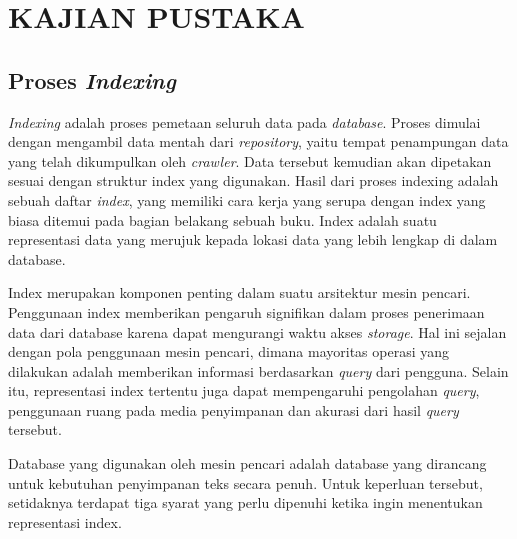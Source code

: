 
\chapter{KAJIAN PUSTAKA} 


\section{Proses \emph{Indexing}}

\emph{Indexing} adalah proses pemetaan seluruh data pada \emph{database}.
Proses dimulai dengan mengambil data mentah dari \emph{repository}, yaitu tempat
penampungan data yang telah dikumpulkan oleh \emph{crawler}. Data tersebut
kemudian akan dipetakan sesuai dengan struktur index yang digunakan. Hasil dari
proses indexing adalah sebuah daftar \emph{index}, yang memiliki cara kerja yang
serupa dengan index yang biasa ditemui pada bagian belakang sebuah buku. Index
adalah suatu representasi data yang merujuk kepada lokasi data yang lebih
lengkap di dalam database.

Index merupakan komponen penting dalam suatu arsitektur mesin pencari.
Penggunaan index memberikan pengaruh signifikan dalam proses penerimaan data
dari database karena dapat mengurangi waktu akses \emph{storage}. Hal ini
sejalan dengan pola penggunaan mesin pencari, dimana mayoritas operasi yang
dilakukan adalah memberikan informasi berdasarkan \emph{query} dari pengguna.
Selain itu, representasi index tertentu juga dapat mempengaruhi pengolahan
\emph{query}, penggunaan ruang pada media penyimpanan dan akurasi dari hasil
\emph{query} tersebut.

Database yang digunakan oleh mesin pencari adalah database yang dirancang
untuk kebutuhan penyimpanan teks secara penuh. Untuk keperluan tersebut,
setidaknya terdapat tiga syarat yang perlu dipenuhi ketika ingin menentukan
representasi index.

